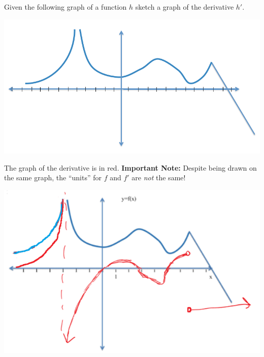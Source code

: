 \documentclass[nooutcomes]{ximera}
\begin{document}
\begin{problem}

	 Given the following graph of a function $h$ sketch a graph of the derivative $h'$.
  \begin{image}
    \includegraphics[scale=.7]{Figure4.png}
  \end{image}
  \begin{freeResponse}
    The graph of the derivative is in red.
    \textbf{Important Note:} Despite being drawn on the same graph, the ``units'' for $f$ and $f'$ are \emph{not} the same!
    \begin{image}
      \includegraphics[scale = 0.7]{Figure5.png}
    \end{image}
  \end{freeResponse}
\end{problem}
\end{document}
